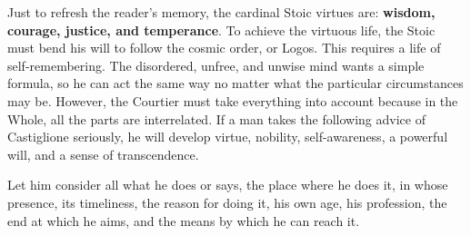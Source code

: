 Just to refresh the reader's memory, the cardinal Stoic virtues are: \textbf{wisdom, courage, justice, and temperance}. To achieve the virtuous life, the Stoic must bend his will to follow the cosmic order, or Logos. This requires a life of self-remembering. The disordered, unfree, and unwise mind wants a simple formula, so he can act the same way no matter what the particular circumstances may be. However, the Courtier must take everything into account because in the Whole, all the parts are interrelated. If a man takes the following advice of Castiglione seriously, he will develop virtue, nobility, self-awareness, a powerful will, and a sense of transcendence.

\begin{quotex}
Let him consider all what he does or says, the place where he does it, in whose presence, its timeliness, the reason for doing it, his own age, his profession, the end at which he aims, and the means by which he can reach it.
\end{quotex}


